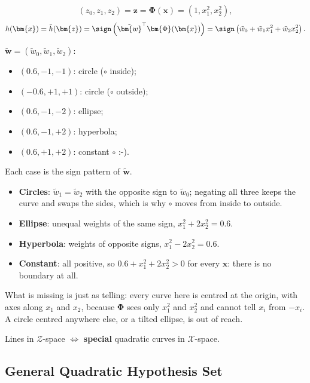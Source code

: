 \[
    (z_0, z_1, z_2) = \bm{z} = \bm{\Phi}(\bm{x}) = (1, x_1^2, x_2^2),
\]
\[
    h(\bm{x}) = \tilde{h}(\bm{z}) = \sign \left( \tilde{\bm{w}}^\top
    \bm{\Phi}(\bm{x}) \right) = \sign \left( \tilde{w}_0 + \tilde{w}_1 x_1^2 +
    \tilde{w}_2 x_2^2 \right) .
\]

\(\tilde{\bm{w}} = (\tilde{w}_0, \tilde{w}_1, \tilde{w}_2)\):
\begin{itemize}
    \item \((0.6, -1, -1)\): circle (\(\circ\) inside);
    \item \((-0.6, +1, +1)\): circle (\(\circ\) outside);
    \item \((0.6, -1, -2)\): ellipse;
    \item \((0.6, -1, +2)\): hyperbola;
    \item \((0.6, +1, +2)\): constant \(\circ\) :-).
\end{itemize}

Each case is the sign pattern of \(\tilde{\bm{w}}\).
\begin{itemize}
    \item \textbf{Circles}: \(\tilde{w}_1 = \tilde{w}_2\) with the opposite sign
        to \(\tilde{w}_0\); negating all three keeps the curve and swaps the
        sides, which is why \(\circ\) moves from inside to outside.
    \item \textbf{Ellipse}: unequal weights of the same sign, \(x_1^2 + 2x_2^2 =
        0.6\).
    \item \textbf{Hyperbola}: weights of opposite signs, \(x_1^2 - 2x_2^2 =
        0.6\).
    \item \textbf{Constant}: all positive, so \(0.6 + x_1^2 + 2x_2^2 > 0\) for
        every \(\bm{x}\): there is no boundary at all.
\end{itemize}
What is missing is just as telling: every curve here is centred at the origin,
with axes along \(x_1\) and \(x_2\), because \(\bm{\Phi}\) sees only \(x_1^2\)
and \(x_2^2\) and cannot tell \(x_i\) from \(-x_i\). A circle centred anywhere
else, or a tilted ellipse, is out of reach.

\begin{moral}
    Lines in \(\mathcal{Z}\)-space \(\iff\) \textbf{special} quadratic curves in
    \(\mathcal{X}\)-space.
\end{moral}

\subsection{General Quadratic Hypothesis Set}


